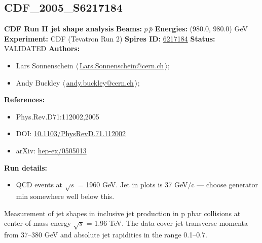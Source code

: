 \clearpage

\subsection[CDF\_2005\_S6217184]{CDF\_2005\_S6217184\,\cite{Acosta:2005ix}}
\textbf{CDF Run II jet shape analysis}\newline
\textbf{Beams:} $p$\,$\bar{p}$ \newline
\textbf{Energies:} (980.0, 980.0) GeV \newline
\textbf{Experiment:} CDF (Tevatron Run 2) \newline
\textbf{Spires ID:} \href{http://www.slac.stanford.edu/spires/find/hep/www?rawcmd=key+6217184}{6217184}\newline
\textbf{Status:} VALIDATED\newline
\textbf{Authors:}
\begin{itemize}
  \item Lars Sonnenschein $\langle\,$\href{mailto:Lars.Sonnenschein@cern.ch}{Lars.Sonnenschein@cern.ch}$\,\rangle$;
  \item Andy Buckley $\langle\,$\href{mailto:andy.buckley@cern.ch}{andy.buckley@cern.ch}$\,\rangle$;
\end{itemize}
\textbf{References:}
\begin{itemize}
  \item Phys.Rev.D71:112002,2005
  \item DOI: \href{http://dx.doi.org/10.1103/PhysRevD.71.112002}{10.1103/PhysRevD.71.112002}
  \item arXiv: \href{http://arxiv.org/abs/hep-ex/0505013}{hep-ex/0505013}
\end{itemize}
\textbf{Run details:}
\begin{itemize}

  \item QCD events at \ensuremath{\sqrt{s}} = 1960 GeV. Jet \pTmin in plots is 37 GeV/c --- choose generator min \pT somewhere well below this.\end{itemize}

\noindent Measurement of jet shapes in inclusive jet production in p pbar collisions at center-of-mass energy \ensuremath{\sqrt{s}} = 1.96 TeV. The data cover jet transverse momenta from 37--380 GeV and absolute jet rapidities in the range 0.1--0.7.

\clearpage


\clearpage


